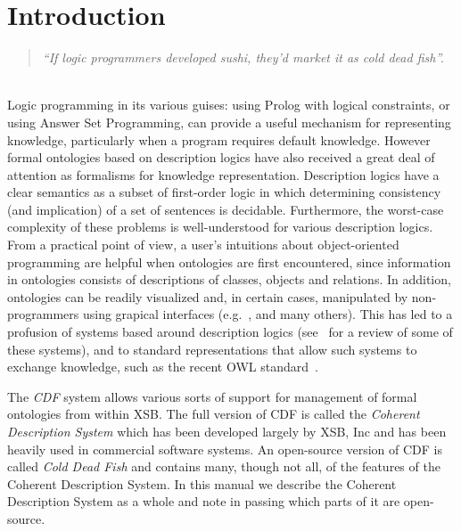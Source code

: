 
\chapter{Introduction}

\begin{quote}
{\it  ``If logic programmers developed sushi, they'd market it as
cold dead fish''.} 
\end{quote}
\ \\

Logic programming in its various guises: using Prolog with logical
constraints, or using Answer Set Programming, can provide a useful
mechanism for representing knowledge, particularly when a program
requires default knowledge.  However formal ontologies based on
description logics have also received a great deal of attention as
formalisms for knowledge representation.  Description logics have a
clear semantics as a subset of first-order logic in which determining
consistency (and implication) of a set of sentences is decidable.
Furthermore, the worst-case complexity of these problems is
well-understood for various description logics.  From a practical
point of view, a user's intuitions about object-oriented programming
are helpful when ontologies are first encountered, since information
in ontologies consists of descriptions of classes, objects and
relations.  In addition, ontologies can be readily visualized and, in
certain cases, manipulated by non-programmers using grapical
interfaces (e.g.~\cite{protege}, and many others).  This has led to a
profusion of systems based around description logics
(see~\cite{MolH03} for a review of some of these systems), and to
standard representations that allow such systems to exchange
knowledge, such as the recent OWL standard~\cite{SMVW02}.

The {\em CDF} system allows various sorts of support for management of
formal ontologies from within XSB.  The full version of CDF is called
the {\em Coherent Description System} which has been developed largely
by XSB, Inc and has been heavily used in commercial software systems.
An open-source version of CDF is called {\em Cold Dead Fish} and
contains many, though not all, of the features of the Coherent
Description System.  In this manual we describe the Coherent
Description System as a whole and note in passing which parts of it
are open-source.

